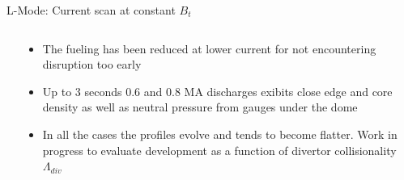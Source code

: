 \documentclass[10pt, compress]{beamer}
\newcommand\Fontvi{\fontsize{8}{7.2}\selectfont}
\begin{document}
\begin{frame}{L-Mode: Current scan at constant $B_{t}$}
\Fontvi
  \vspace{-1cm}
\begin{columns}
  \begin{column}{0.5\textwidth}
  \end{column}
  \begin{column}{0.5\textwidth}
    \begin{itemize}
      \item<1-> The fueling has been reduced at lower current for not
        encountering disruption too early
      \item<2-> Up to 3 seconds 0.6 and 0.8 MA discharges exibits close
        edge and core density as well as neutral pressure from gauges
        under the dome
      \item<3> In all the cases the profiles evolve and tends to
        become flatter. Work in progress to evaluate development as a
        function of divertor collisionality $\Lambda_{div}$
    \end{itemize}
  
  \end{column}
\end{columns}
\end{frame}
\end{document}
